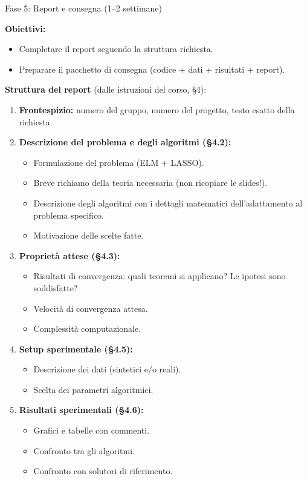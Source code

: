 \documentclass[a4paper,11pt]{article}
\begin{document}
\begin{phasebox}{Fase 5: Report e consegna (1--2 settimane)}

\textbf{Obiettivi:}
\begin{itemize}[nosep]
  \item Completare il report seguendo la struttura richiesta.
  \item Preparare il pacchetto di consegna (codice + dati + risultati + report).
\end{itemize}

\textbf{Struttura del report} (dalle istruzioni del corso, \S 4):
\begin{enumerate}
  \item \textbf{Frontespizio:} numero del gruppo, numero del progetto, testo esatto della richiesta.
  \item \textbf{Descrizione del problema e degli algoritmi (\S 4.2):}
  \begin{itemize}[nosep]
    \item Formulazione del problema (ELM + LASSO).
    \item Breve richiamo della teoria necessaria (non ricopiare le slides!).
    \item Descrizione degli algoritmi con i dettagli matematici dell'adattamento al problema specifico.
    \item Motivazione delle scelte fatte.
  \end{itemize}
  \item \textbf{Proprietà attese (\S 4.3):}
  \begin{itemize}[nosep]
    \item Risultati di convergenza: quali teoremi si applicano? Le ipotesi sono soddisfatte?
    \item Velocità di convergenza attesa.
    \item Complessità computazionale.
  \end{itemize}
  \item \textbf{Setup sperimentale (\S 4.5):}
  \begin{itemize}[nosep]
    \item Descrizione dei dati (sintetici e/o reali).
    \item Scelta dei parametri algoritmici.
  \end{itemize}
  \item \textbf{Risultati sperimentali (\S 4.6):}
  \begin{itemize}[nosep]
    \item Grafici e tabelle con commenti.
    \item Confronto tra gli algoritmi.
    \item Confronto con solutori di riferimento.
  \end{itemize}
\end{enumerate}


\end{phasebox}
\end{document}

